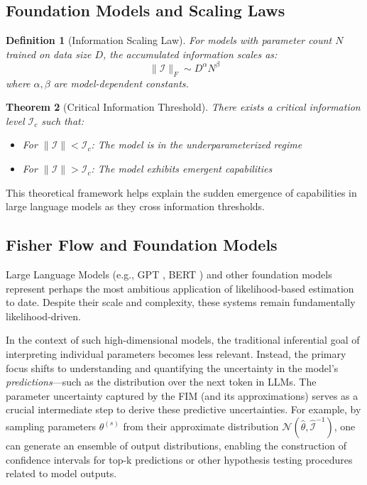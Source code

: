 \documentclass[11pt]{article}
\newtheorem{theorem}{Theorem}
\newtheorem{definition}[theorem]{Definition}
\begin{document}
\subsection{Foundation Models and Scaling Laws}

\begin{definition}[Information Scaling Law]
For models with parameter count $N$ trained on data size $D$, the accumulated information scales as:
\begin{equation}
\|\mathcal{I}\|_F \sim D^\alpha N^\beta
\end{equation}
where $\alpha, \beta$ are model-dependent constants.
\end{definition}

\begin{theorem}[Critical Information Threshold]
\label{thm:critical_info}
There exists a critical information level $\mathcal{I}_c$ such that:
\begin{itemize}
\item For $\|\mathcal{I}\| < \mathcal{I}_c$: The model is in the underparameterized regime
\item For $\|\mathcal{I}\| > \mathcal{I}_c$: The model exhibits emergent capabilities
\end{itemize}
\end{theorem}

This theoretical framework helps explain the sudden emergence of capabilities in large language models as they cross information thresholds.

\subsection{Fisher Flow and Foundation Models}
Large Language Models (e.g., GPT \cite{radford2018improving}, BERT \cite{devlin2018bert}) and other foundation models represent perhaps the most ambitious application of likelihood-based estimation to date. Despite their scale and complexity, these systems remain fundamentally likelihood-driven.

In the context of such high-dimensional models, the traditional inferential goal of interpreting individual parameters becomes less relevant. Instead, the primary focus shifts to understanding and quantifying the uncertainty in the model's \textit{predictions}---such as the distribution over the next token in LLMs. The parameter uncertainty captured by the FIM (and its approximations) serves as a crucial intermediate step to derive these predictive uncertainties. For example, by sampling parameters $\theta^{(s)}$ from their approximate distribution $\mathcal{N}(\hat{\theta}, \hat{\mathcal{I}}^{-1})$, one can generate an ensemble of output distributions, enabling the construction of confidence intervals for top-k predictions or other hypothesis testing procedures related to model outputs.
\end{document}
